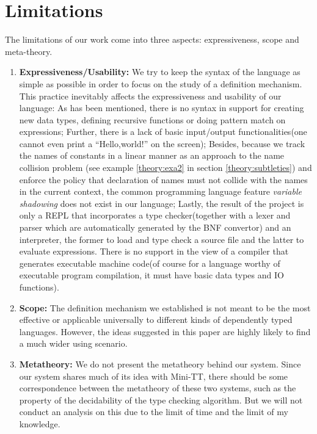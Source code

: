 \section{Limitations}
The limitations of our work come into three aspects: expressiveness, scope and meta-theory.
\begin{enumerate}
\item \textbf{Expressiveness/Usability:} We try to keep the syntax of the language as simple as possible in order to focus on the study of a definition mechanism. This practice inevitably affects the expressiveness and usability of our language: As has been mentioned, there is no syntax in support for creating new data types, defining recursive functions or doing pattern match on expressions; Further, there is a lack of basic input/output functionalities(one cannot even print a ``Hello,world!'' on the screen); Besides, because we track the names of constants in a linear manner as an approach to the name collision problem (see example \ref{theory:exa2} in section \ref{theory:subtleties}) and enforce the policy that declaration of names must not collide with the names in the current context, the common programming language feature \emph{variable shadowing} does not exist in our language; Lastly, the result of the project is only a REPL that incorporates a type checker(together with a lexer and parser which are automatically generated by the BNF convertor) and an interpreter, the former to load and type check a source file and the latter to evaluate expressions. There is no support in the view of a compiler that generates executable machine code(of course for a language worthy of executable program compilation, it must have basic data types and IO functions).
\item \textbf{Scope:} The definition mechanism we established is not meant to be the most effective or applicable universally to different kinds of dependently typed languages. However, the ideas suggested in this paper are highly likely to find a much wider using scenario. 
\item \textbf{Metatheory:} We do not present the metatheory behind our system. Since our system shares much of its idea with Mini-TT, there should be some correspondence between the metatheory of these two systems, such as the property of the decidability of the type checking algorithm. But we will not conduct an analysis on this due to the limit of time and the limit of my knowledge.
\end{enumerate}


